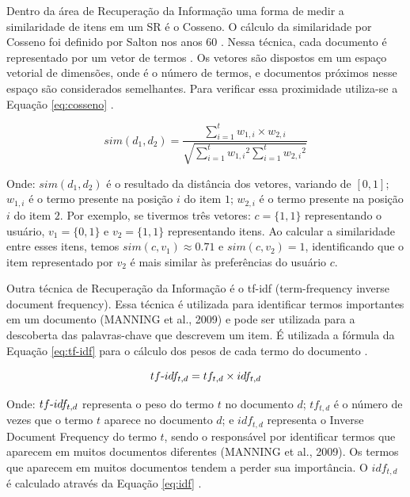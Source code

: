 Dentro da área de Recuperação da Informação uma forma de medir a similaridade de itens em um SR é o Cosseno. O cálculo
da similaridade por Cosseno foi definido por Salton nos anos 60 \cite{salton1964document}. Nessa técnica, cada documento
é representado por um vetor de termos . Os vetores são dispostos em um espaço vetorial de  dimensões, onde  é o número
de termos, e documentos próximos nesse espaço são considerados semelhantes. Para verificar essa proximidade utiliza-se a
Equação \ref{eq:cosseno} \cite{christopher2008introduction}.

\begin{equation}
  sim(d_1, d_2) = \frac{\sum_{i=1}^{t}{w_{1,i} \times w_{2,i}}}{\sqrt{\sum_{i=1}^{t}{w_{1,i}}^2 \sum_{i=1}^{t}{w_{2,i}}^2}}
  \label{eq:cosseno}
\end{equation}


Onde: $sim(d_1, d_2)$ é o resultado da distância dos vetores, variando de $[0,1]$; $w_{1,i}$ é o termo presente na
posição $i$ do item $1$; $w_{2,i}$ é o termo presente na posição $i$ do item $2$. Por exemplo, se tivermos três vetores: $c = \{1,1\}$
representando o usuário, $v_1 = \{0, 1\}$ e $v_2 = \{1, 1\}$ representando itens. Ao calcular a similaridade entre esses itens,
temos $sim(c, v_1) \approx 0.71$ e $sim(c, v_2) = 1$, identificando que o item representado por $v_2$ é mais similar às
preferências do usuário $c$.

Outra técnica de Recuperação da Informação é o tf-idf (term-frequency inverse document frequency). Essa técnica
é utilizada para identificar termos importantes em um documento (MANNING et al., 2009) e pode ser utilizada
para a descoberta das palavras-chave que descrevem um item. É utilizada a fórmula da Equação \ref{eq:tf-idf} para o cálculo dos
pesos de cada termo do documento \cite{christopher2008introduction}.

\begin{equation}
  tf\hbox{-}idf_{t,d} = tf_{t,d} \times idf_{t,d}
  \label{eq:tf-idf}
\end{equation}

Onde: $tf\hbox{-}idf_{t,d}$ representa o peso do termo $t$ no documento $d$; $tf_{t,d}$ é o número de vezes que o termo
$t$ aparece no documento $d$; e $idf_{t,d}$ representa o Inverse Document Frequency do termo $t$, sendo o responsável por
identificar termos que aparecem em muitos documentos diferentes (MANNING et al., 2009). Os termos que aparecem em muitos
documentos tendem a perder sua importância. O $idf_{t,d}$ é calculado através da Equação \ref{eq:idf} \cite{christopher2008introduction}.

